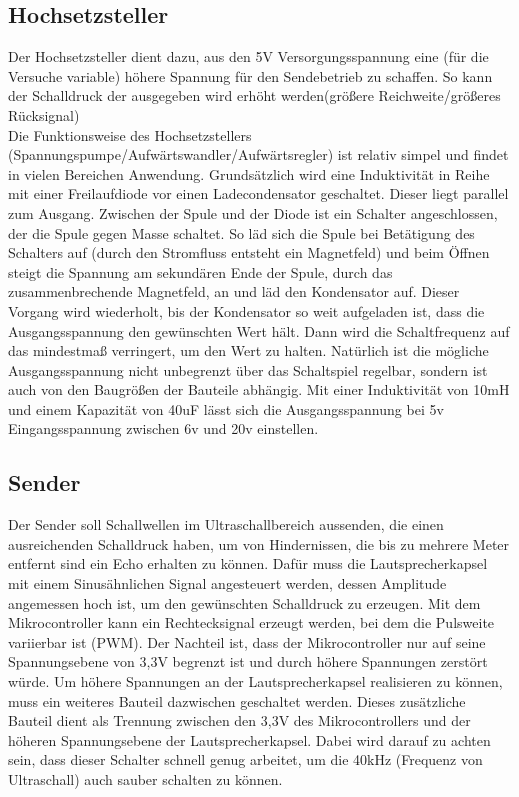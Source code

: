 \subsection{Hochsetzsteller}
Der Hochsetzsteller dient dazu, aus den 5V Versorgungsspannung eine (für die Versuche variable) höhere Spannung für den Sendebetrieb zu schaffen. So kann der Schalldruck der ausgegeben wird erhöht werden(größere Reichweite/größeres Rücksignal)\\
Die Funktionsweise des Hochsetzstellers (Spannungspumpe/Aufwärtswandler/Aufwärtsregler) ist relativ simpel und findet in vielen Bereichen Anwendung. Grundsätzlich wird eine Induktivität in Reihe mit einer Freilaufdiode vor einen Ladecondensator geschaltet. Dieser liegt parallel zum Ausgang. Zwischen der Spule und der Diode ist ein Schalter angeschlossen, der die Spule gegen Masse schaltet. So läd sich die Spule bei Betätigung des Schalters auf (durch den Stromfluss entsteht ein Magnetfeld) und beim Öffnen steigt die Spannung am sekundären Ende der Spule, durch das zusammenbrechende Magnetfeld, an und läd den Kondensator auf. Dieser Vorgang wird wiederholt, bis der Kondensator so weit aufgeladen ist, dass die Ausgangsspannung den gewünschten Wert hält. Dann wird die Schaltfrequenz auf das mindestmaß verringert, um den Wert zu halten. Natürlich ist die mögliche Ausgangsspannung nicht unbegrenzt über das Schaltspiel regelbar, sondern ist auch von den Baugrößen der Bauteile abhängig. Mit einer Induktivität von 10mH und einem Kapazität von 40uF lässt sich die Ausgangsspannung bei 5v Eingangsspannung zwischen 6v und 20v einstellen.
\subsection{Sender}
Der Sender soll Schallwellen im Ultraschallbereich aussenden, die einen ausreichenden Schalldruck haben, um von Hindernissen, die bis zu mehrere Meter entfernt sind ein Echo erhalten zu können.
Dafür muss die Lautsprecherkapsel mit einem Sinusähnlichen Signal angesteuert werden, dessen Amplitude angemessen hoch ist, um den gewünschten Schalldruck zu erzeugen. Mit dem Mikrocontroller kann ein Rechtecksignal erzeugt werden, bei dem die Pulsweite variierbar ist (PWM). Der Nachteil ist, dass der Mikrocontroller nur auf seine Spannungsebene von 3,3V begrenzt ist und durch höhere Spannungen zerstört würde.
Um höhere Spannungen an der Lautsprecherkapsel realisieren zu können, muss ein weiteres Bauteil dazwischen geschaltet werden. Dieses zusätzliche Bauteil dient als Trennung zwischen den 3,3V des Mikrocontrollers und der höheren Spannungsebene der Lautsprecherkapsel. Dabei wird darauf zu achten sein, dass dieser Schalter schnell genug arbeitet, um die 40kHz (Frequenz von Ultraschall) auch sauber schalten zu können.
